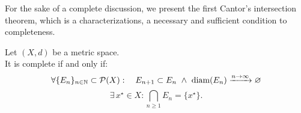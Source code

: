 For the sake of a complete discussion, we present the first Cantor's intersection theorem, which is a characterizations, a necessary and sufficient condition to completeness.

\begin{theo}
    Let $(X,d)$ be a metric space.\\
    It is complete if and only if:
    \[\forall \{E_n\}_{n\in\NN} \subset \Pc(X) : \quad E_{n+1} \subset E_n \ \wedge \ \text{diam}(E_n) \xrightarrow{n\to \infty} \varnothing \]
    \[ \exists \, x^\star \in X : \bigcap_{n\geq 1}E_n= \{x^\star\}.\]
\end{theo}